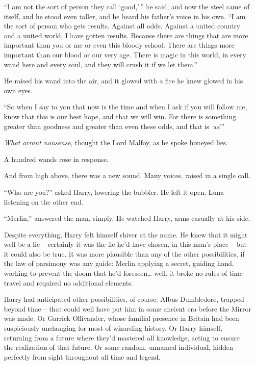 ``I am not the sort of person they call `good,'\,'' he said, and now the
steel came of itself, and he stood even taller, and he heard his
father's voice in his own. ``I am the sort of person who gets results.
Against all odds. Against a united country and a united world, I have
gotten results. Because there are things that are more important than
you or me or even this bloody school. There are things more important
than our blood or our very age. There is magic in this world, in every
wand here and every soul, and they will crush it if we let them.''

He raised his wand into the air, and it glowed with a fire he knew
glowed in his own eyes.

``So when I say to you that now is the time and when I ask if you will
follow me, know that this is our best hope, and that we will win. For
there is something greater than goodness and greater than even these
odds, and that is~\emph{us}!''

\emph{What arrant nonsense}, thought the Lord Malfoy, as he spoke
honeyed lies.

A hundred wands rose in response.

And from high above, there was a new sound. Many voices, raised in a
single call.

\mybreak

``Who are you?'' asked Harry, lowering the bubbler. He left it open,
Luna listening on the other end.

``Merlin,'' answered the man, simply. He watched Harry, arms casually at
his side.

Despite everything, Harry felt himself shiver at the name. He knew that
it might well be a lie -- certainly it was the lie he'd have chosen, in
this man's place -- but it could also be true. It was more plausible
than any of the other possibilities, if the law of parsimony was any
guide: Merlin applying a secret, guiding hand, working to prevent the
doom that he'd foreseen\ldots{} well, it broke no rules of time travel
and required no additional elements.

Harry had anticipated other possibilities, of course. Albus Dumbledore,
trapped beyond time -- that could well have put him in some ancient era
before the Mirror was made. Or Garrick Ollivander, whose familial
presence in Britain had been suspiciously unchanging for most of
wizarding history. Or Harry himself, returning from a future where
they'd mastered all knowledge, acting to ensure the realization of that
future. Or some random, unnamed individual, hidden perfectly from sight
throughout all time and legend.

